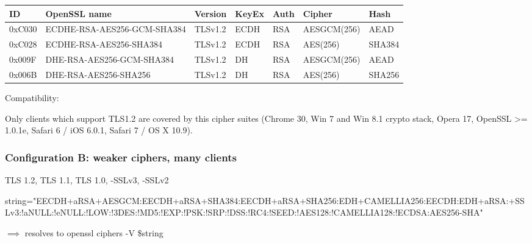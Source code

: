 %



\begin{center}
\begin{tabular}{| l | l | l | l | l| l | l |}
\hline
ID        & OpenSSL name                & Version & KeyEx & Auth & Cipher & Hash \\ \hline
0xC030 & ECDHE-RSA-AES256-GCM-SHA384 & TLSv1.2 & ECDH  &  RSA &AESGCM(256)  & AEAD   \\ \hline
0xC028 & ECDHE-RSA-AES256-SHA384     & TLSv1.2 & ECDH  &  RSA &AES(256)     & SHA384 \\ \hline
0x009F & DHE-RSA-AES256-GCM-SHA384   & TLSv1.2 & DH    &  RSA &AESGCM(256)  & AEAD   \\ \hline
0x006B & DHE-RSA-AES256-SHA256       & TLSv1.2 & DH    &  RSA &AES(256)     & SHA256 \\ \hline
\end{tabular}
\end{center}


Compatibility:

Only clients which support TLS1.2 are covered by this cipher suites (Chrome 30, Win 7 and Win 8.1 crypto stack, Opera 17, OpenSSL >= 1.0.1e, Safari 6 / iOS 6.0.1, Safari 7 / OS X 10.9).



\subsubsection{Configuration B: weaker ciphers, many clients}

TLS 1.2, TLS 1.1, TLS 1.0, -SSLv3, -SSLv2


string="EECDH+aRSA+AESGCM:EECDH+aRSA+SHA384:EECDH+aRSA+SHA256:EDH+CAMELLIA256:EECDH:EDH+aRSA:+SSLv3:!aNULL:!eNULL:!LOW:!3DES:!MD5:!EXP:!PSK:!SRP:!DSS:!RC4:!SEED:!AES128:!CAMELLIA128:!ECDSA:AES256-SHA"


$\implies$ resolves to openssl ciphers -V \$string

